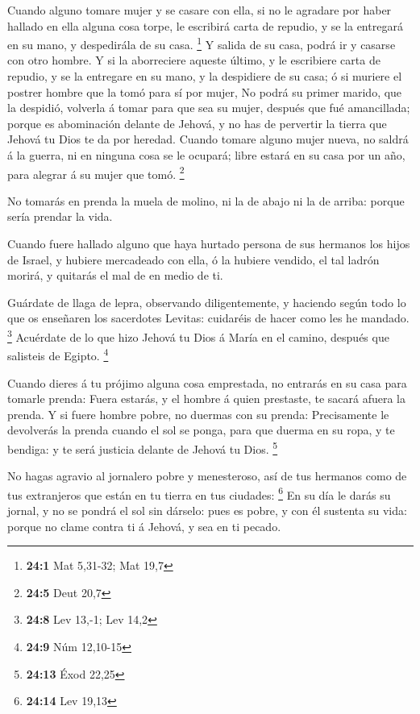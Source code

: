  Cuando alguno tomare mujer y se casare con ella, si no le
agradare por haber hallado en ella alguna cosa torpe, le escribirá carta
de repudio, y se la entregará en su mano, y despedirála de su casa.
\footnote{\textbf{24:1} Mat 5,31-32; Mat 19,7}  Y salida
de su casa, podrá ir y casarse con otro hombre.  Y si la
aborreciere aqueste último, y le escribiere carta de repudio, y se la
entregare en su mano, y la despidiere de su casa; ó si muriere el
postrer hombre que la tomó para sí por mujer,  No podrá su
primer marido, que la despidió, volverla á tomar para que sea su mujer,
después que fué amancillada; porque es abominación delante de Jehová, y
no has de pervertir la tierra que Jehová tu Dios te da por heredad.
 Cuando tomare alguno mujer nueva, no saldrá á la guerra,
ni en ninguna cosa se le ocupará; libre estará en su casa por un año,
para alegrar á su mujer que tomó. \footnote{\textbf{24:5} Deut 20,7}

 No tomarás en prenda la muela de molino, ni la de abajo
ni la de arriba: porque sería prendar la vida.

 Cuando fuere hallado alguno que haya hurtado persona de
sus hermanos los hijos de Israel, y hubiere mercadeado con ella, ó la
hubiere vendido, el tal ladrón morirá, y quitarás el mal de en medio de
ti.

 Guárdate de llaga de lepra, observando diligentemente, y
haciendo según todo lo que os enseñaren los sacerdotes Levitas:
cuidaréis de hacer como les he mandado. \footnote{\textbf{24:8} Lev
  13,-1; Lev 14,2}  Acuérdate de lo que hizo Jehová tu
Dios á María en el camino, después que salisteis de Egipto. \footnote{\textbf{24:9}
  Núm 12,10-15}

 Cuando dieres á tu prójimo alguna cosa emprestada, no
entrarás en su casa para tomarle prenda:  Fuera estarás,
y el hombre á quien prestaste, te sacará afuera la prenda.
 Y si fuere hombre pobre, no duermas con su prenda:
 Precisamente le devolverás la prenda cuando el sol se
ponga, para que duerma en su ropa, y te bendiga: y te será justicia
delante de Jehová tu Dios. \footnote{\textbf{24:13} Éxod 22,25}

 No hagas agravio al jornalero pobre y menesteroso, así
de tus hermanos como de tus extranjeros que están en tu tierra en tus
ciudades: \footnote{\textbf{24:14} Lev 19,13}  En su día
le darás su jornal, y no se pondrá el sol sin dárselo: pues es pobre, y
con él sustenta su vida: porque no clame contra ti á Jehová, y sea en ti
pecado.

